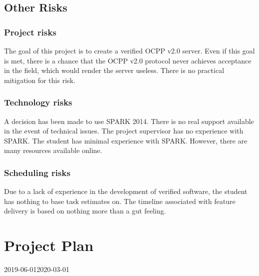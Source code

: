 \documentclass[11pt]{article}
\begin{document}
\subsection{Other Risks} 
\subsubsection{Project risks} 
The goal of this project is to create a verified OCPP v2.0 server. Even if this goal is met, there is a chance that the OCPP v2.0 protocol never achieves acceptance in the field, which would render the server useless. There is no practical mitigation for this risk.

\subsubsection{Technology risks} 
A decision has been made to use SPARK 2014. There is no real support available in the event of technical issues. The project supervisor has no experience with SPARK. The student has minimal experience with SPARK. However, there are many resources available online.

\subsubsection{Scheduling risks} 
Due to a lack of experience in the development of verified software, the student has nothing to base task estimates on. The timeline associated with feature delivery is based on nothing more than a gut feeling. 
 

\section{Project Plan}

\begin{ganttchart}[
	expand chart=\textwidth,
	hgrid,
	vgrid,
	time slot format=isodate,
	time slot unit=month,
	]{2019-06-01}{2020-03-01}
	 \\
 \\
 \ganttnewline
{} \ganttnewline
{} \ganttnewline
{} \ganttnewline
{} \ganttnewline
{} \ganttnewline
{} \ganttnewline
{} \ganttnewline
{} \ganttnewline
{} \ganttnewline
{} \ganttnewline
{} \ganttnewline
\end{ganttchart}
\end{document}
